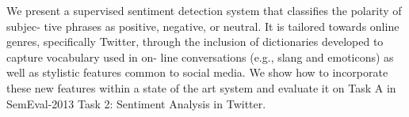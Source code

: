 We present a supervised sentiment detection system that classifies the polarity of subjec- tive phrases as positive, negative, or neutral. It is tailored
 towards online genres, specifically Twitter, through the inclusion of
 dictionaries developed to capture vocabulary used in on- line conversations
 (e.g., slang and emoticons) as well as stylistic features common to social
 media. We show how to incorporate these new features within a state of the art
 system and evaluate it on Task A in SemEval-2013 Task 2: Sentiment Analysis in
 Twitter.

